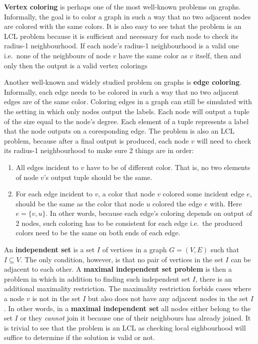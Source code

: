 \textbf{Vertex coloring} is perhaps one of the most well-known
problems on graphs. Informally, the goal is to color a graph
in such a way that no two adjacent nodes are colored with the
same colors. It is also easy to see tshat the problem is an
LCL problem because it is sufficient and necessary for each node to check
its radius-1 neighbourhood. If each node's radius-1 neighbourhood is
a valid one i.e.\ none of the neighbours of node $v$ have the same color as $v$
itself, then and only then the output is a valid vertex colorings

Another well-known and widely studied problem on graphs is
\textbf{edge coloring}. Informally, each edge needs to be
colored in such a way that no two adjacent edges are of the same
color. Coloring edges in a graph can still be simulated
with the setting in which only nodes output the labels.
Each node will output a tuple of the size equal to the node's
degree. Each element of a tuple represents a label
that the node outputs on a coresponding edge. The problem
is also an LCL problem, because after a final output is
produced, each node $v$ will need to check its radius-1
neighbourhood to make sure 2 things are in order:
\begin{enumerate}
  \item All edges incident to $v$ have to be of different color.
That is, no two elements of node $v$'s output tuple should be the same.

  \item For each edge incident to $v$, a color that node $v$ colored some incident
edge $e$, should be the same as the color that node $u$ colored the edge $e$ with.
Here $e = \{v, u\}$. In other words, because each edge's coloring depends on
output of 2 nodes, such coloring has to be consistent for each edge i.e.\ the produced
colors need to be the same on both ends of each edge.
\end{enumerate}

An \textbf{independent set} is a set $I$ of vertices in a graph $G = (V, E)$ such that
$I \subseteq V$. The only condition, however, is that no pair of vertices in the set $I$
can be adjacent to each other. A \textbf{maximal independent set problem} is then a
problem in which in addition to finding such independent set $I$, there is an additional
maximality restriction. The maximality restriction forbids cases where a node $v$
is not in the set $I$ but also does not have any adjacent nodes in the set $I$.
In other words, in a \textbf{maximal independent set} all nodes either belong
to the set $I$ or they \emph{cannot} join it because one of their neighbours has
already joined. It is trivial to see that the problem is an LCL as checking local
eighbourhood will suffice to determine if the solution is valid or not.


